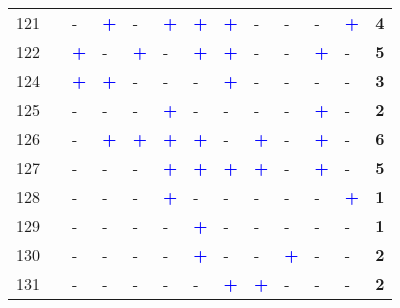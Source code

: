 \begin{longtable}{p{0.5cm}p{4.6cm}p{0.3cm}p{0.3cm}p{0.3cm}p{0.3cm}p{0.3cm}p{0.3cm}p{0.3cm}p{0.3cm}p{0.3cm}p{0.3cm}p{1cm}}
    \small{121} & \small{\textcite{liu_measuring_2022}}\index{Liu, Lumei|pagebf} & - & \textcolor{blue}{\textbf{+}} & - & \textcolor{blue}{\textbf{+}} & \textcolor{blue}{\textbf{+}} & \textcolor{blue}{\textbf{+}} & - & - & - & \textcolor{blue}{\textbf{+}} & \textbf{4}\\
    \small{122} & \small{\textcite{liu_mode_2022}}\index{Liu, Lumei|pagebf} & \textcolor{blue}{\textbf{+}} & - & \textcolor{blue}{\textbf{+}} & - & \textcolor{blue}{\textbf{+}} & \textcolor{blue}{\textbf{+}} & - & - & \textcolor{blue}{\textbf{+}} & - & \textbf{5}\\
    \small{124} & \small{\textcite{liu_temporal_2022}}\index{Liu, Siyang|pagebf} & \textcolor{blue}{\textbf{+}} & \textcolor{blue}{\textbf{+}} & - & - & - & \textcolor{blue}{\textbf{+}} & - & - & - & - & \textbf{3}\\
    \small{125} & \small{\textcite{liu_concordance_2022}}\index{Liu, Siyang|pagebf} & - & - & - & \textcolor{blue}{\textbf{+}} & - & - & - & - & \textcolor{blue}{\textbf{+}} & - & \textbf{2}\\
    \small{126} & \small{\textcite{liu_use_2020}}\index{Liu, Yang|pagebf} & - & \textcolor{blue}{\textbf{+}} & \textcolor{blue}{\textbf{+}} & \textcolor{blue}{\textbf{+}} & \textcolor{blue}{\textbf{+}} & - & \textcolor{blue}{\textbf{+}} & - & \textcolor{blue}{\textbf{+}} & - & \textbf{6}\\
    \small{127} & \small{\textcite{liu_understanding_2020}}\index{Liu, Yang|pagebf} & - & - & - & \textcolor{blue}{\textbf{+}} & \textcolor{blue}{\textbf{+}} & \textcolor{blue}{\textbf{+}} & \textcolor{blue}{\textbf{+}} & - & \textcolor{blue}{\textbf{+}} & - & \textbf{5}\\
    \small{128} & \small{\textcite{liu_simultaneous_2015}}\index{Liu, Yang|pagebf} & - & - & - & \textcolor{blue}{\textbf{+}} & - & - & - & - & - & \textcolor{blue}{\textbf{+}} & \textbf{1}\\
    \small{129} & \small{\textcite{liu_solving_2012}}\index{Liu, Zhili|pagebf} & - & - & - & - & \textcolor{blue}{\textbf{+}} & - & - & - & - & - & \textbf{1}\\
    \small{130} & \small{\textcite{lu_improving_2018}}\index{Lu, Miaojia|pagebf} & - & - & - & - & \textcolor{blue}{\textbf{+}} & - & - & \textcolor{blue}{\textbf{+}} & - & - & \textbf{2}\\
    \small{131} & \small{\textcite{luan_better_2020}}\index{Luan, Xin|pagebf} & - & - & - & - & - & \textcolor{blue}{\textbf{+}} & \textcolor{blue}{\textbf{+}} & - & - & - & \textbf{2}\\

\end{longtable}

